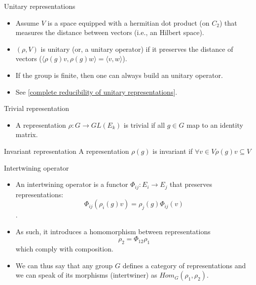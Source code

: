 \documentclass[presentation]{beamer}
\begin{document}
\begin{frame}[label={sec:org6153e03}]{Unitary representations}
\begin{itemize}
\item Assume \(V\) is a space equipped with a hermitian dot product (on \(C_2\))
that measures the distance between vectors (i.e., an Hilbert space).

\item \((\rho,V)\) is unitary (or, a unitary operator) if it preserves the
distance of vectors (\(\langle\rho(g)v,\rho(g)w\rangle = \langle v,w
      \rangle\)).

\item If the group is finite, then one can always build an unitary operator.

\item See [\href{https://en.wikipedia.org/wiki/Unitary\_representation\#Complete\_reducibility}{complete reducibility of unitary representations}].
\end{itemize}
\end{frame}

\begin{frame}[label={sec:org7a02ba8}]{Trivial representation}
\begin{itemize}
\item A representation \(\rho: G \rightarrow GL(E_k)\) is trivial if all \(g \in G\)
map to an identity matrix.
\end{itemize}
\end{frame}

\begin{frame}[label={sec:org627d49e}]{Invariant representation}
A representation \(\rho(g)\) is \alert{invariant} if \(\forall v \in V \rho(g)v \subseteq V\)
\end{frame}

\begin{frame}[label={sec:org4c2411b}]{Intertwining operator}
\begin{itemize}
\item An intertwining operator is a functor \(\Phi_{ij}: E_i \rightarrow E_j\) that
preserves representations: $$\Phi_{ij}(\rho_i(g)v)=\rho_j(g)\Phi_{ij}(v)$$.

\item As such, it introduces a homomorphism between representations $$\rho_2
    = \Phi_{12} \rho_1$$ which comply with composition.

\item We can thus say that any group \(G\) defines a \alert{category of representations} and
we can speak of its morphisms (intertwiner) as \(Hom_G(\rho_1, \rho_2)\).
\end{itemize}
\end{frame}
\end{document}
